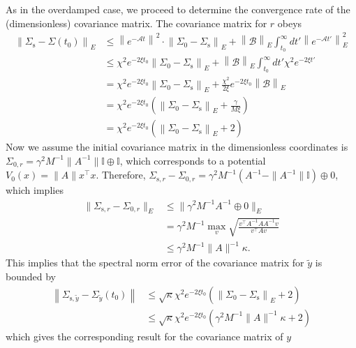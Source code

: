 \documentclass[prx,onecolumn,floatfix,longbibliography,notitlepage, nofootinbib]{revtex4-1}
\renewcommand{\leq}{\leqslant}
\begin{document}
\begin{appendix}
\begin{equation}
\end{equation}
As in the overdamped case, we proceed to determine the convergence rate of the (dimensionless) covariance matrix. The covariance matrix for $r$ obeys
\begin{align}
    \left\|\Sigma_\text{s} - \Sigma(t_0) \right\|_E
 & \leq 
  \left\| e^{-\mathcal{A} t}\right\|^2 \cdot \left\| \Sigma_0 - \Sigma_\text{s}\right\|_E+ \left\|\mathcal{B}\right\|_E\int_{t_0}^\infty dt' \left\| e^{-\mathcal{A} t'}\right\|_E^2 \\
  & \leq    \chi^2 e^{- 2\xi t_0 }\left\| \Sigma_0 - \Sigma_\text{s}\right\|_E+ \left\|\mathcal{B}\right\|_E\int_{t_0}^\infty dt'\chi^2 e^{-2\xi t'} \\
  & =  \chi^2 e^{- 2\xi t_0 }\left\| \Sigma_0 - \Sigma_\text{s}\right\|_E+\frac{\chi^2}{2\xi}e^{-2 \xi t_0} \left\|\mathcal{B}\right\|_E \\
  & = \chi^2 e^{- 2\xi t_0 }\left(\left\| \Sigma_0 - \Sigma_\text{s}\right\|_E+\frac{\gamma }{M \xi}\right)\\
  & =  \chi^2 e^{- 2\xi t_0 }\left(\left\| \Sigma_0 - \Sigma_\text{s}\right\|_E+2\right)
\end{align} 
Now we assume the initial covariance matrix in the dimensionless coordinates is $\Sigma_{0,r} = \gamma^2 M^{-1} \|A^{-1}\| \mathbb{I}\oplus \mathbb{I}$, which corresponds to a potential $V_0(x) = \|A\| x^\intercal x$. Therefore, $\Sigma_{\text{s},r} - \Sigma_{0,r} = \gamma^2 M^{-1}( A^{-1} - \|A^{-1}\|\mathbb{I}) \oplus 0$, which implies
\begin{align}
    \|\Sigma_{\text{s},r} - \Sigma_{0,r}\|_E &\leq \|\gamma^2 M^{-1} A^{-1}\oplus 0\|_E \\
    & =\gamma^2 M^{-1} \max_{v} \sqrt{\frac{v^\intercal A^{-1}AA^{-1} v}{v^\intercal A v}} \\
    & \leq \gamma^2 M^{-1} \|A\|^{-1} \kappa.
\end{align}
This implies that the spectral norm error of the covariance matrix for $\tilde{y}$ is bounded by
\begin{align}
    \left\|\Sigma_{\text{s},\tilde{y}} - \Sigma_{\tilde{y}}(t_0)\right\| &\leq
    \sqrt{\kappa}\chi^2 e^{- 2\xi t_0 }\left(\left\| \Sigma_0 - \Sigma_\text{s}\right\|_E+2\right)\\
    & \leq \sqrt{\kappa}\chi^2 e^{- 2\xi t_0 }\left(\gamma^2 M^{-1} \|A\|^{-1} \kappa+2\right)
\end{align}
which gives the corresponding result for the covariance matrix of $y$
\begin{equation}

\end{equation}
\end{appendix}
\end{document}
